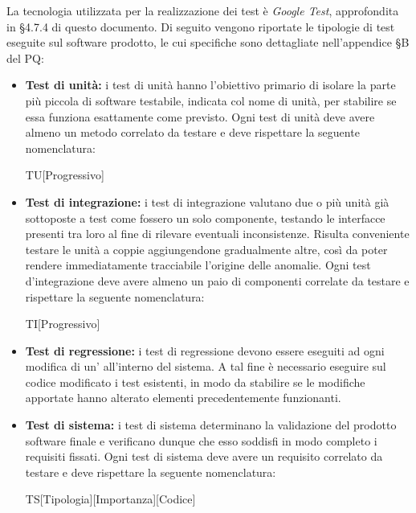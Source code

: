 \documentclass[../NormediProgetto.tex]{subfiles}
\begin{document}
La tecnologia utilizzata per la realizzazione dei test è \textit{Google Test}, approfondita in §4.7.4 di questo documento. 
Di seguito vengono riportate le tipologie di test eseguite sul software prodotto, le cui specifiche sono dettagliate nell'appendice §B del PQ:

\begin{itemize}
    \item \textbf{Test di unità:} i test di unità hanno l'obiettivo primario di isolare la parte più piccola di software testabile, indicata col nome di unità, per stabilire se essa funziona esattamente come previsto. Ogni test di unità deve avere almeno un metodo correlato da testare e deve rispettare la seguente nomenclatura:
    
    \begin{center}
        TU[Progressivo]
    \end{center}

    \item \textbf{Test di integrazione:} i test di integrazione valutano due o più unità già sottoposte a test come fossero un solo componente, testando le interfacce presenti tra loro al fine di rilevare eventuali inconsistenze. Risulta conveniente testare le unità a coppie aggiungendone gradualmente altre, così da poter rendere immediatamente tracciabile l'origine delle anomalie. Ogni test d'integrazione deve avere almeno un paio di componenti correlate da testare e rispettare la seguente nomenclatura:
    
    \begin{center}
        TI[Progressivo]
    \end{center}
    
    \item \textbf{Test di regressione:} i test di regressione devono essere eseguiti ad ogni modifica di un’ all'interno del sistema. A tal fine è necessario eseguire sul codice modificato i test esistenti, in modo da stabilire se le modifiche apportate hanno alterato elementi precedentemente funzionanti.
    
    \item \textbf{Test di sistema:} i test di sistema determinano la validazione del prodotto software finale e verificano dunque che esso soddisfi in modo completo i requisiti fissati. Ogni test di sistema deve avere un requisito correlato da testare e deve rispettare la seguente nomenclatura:
    
    \begin{center}
        TS[Tipologia][Importanza][Codice]
    \end{center}


\end{itemize}
\end{document}
